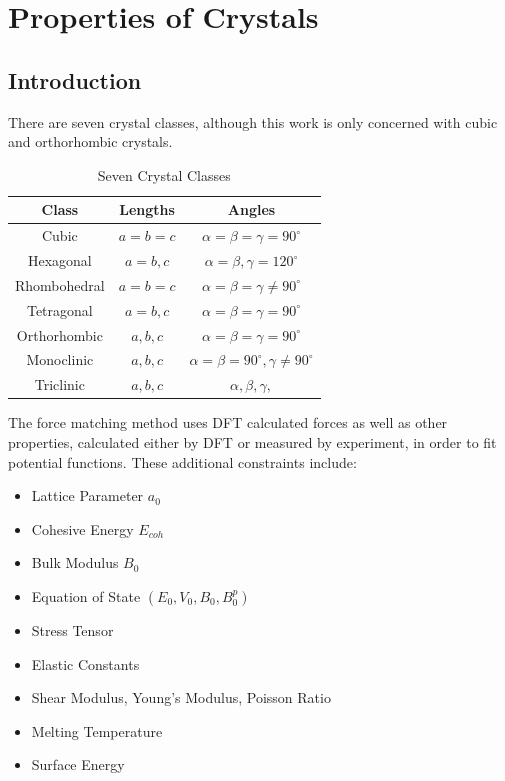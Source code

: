 \section{Properties of Crystals}

\subsection{Introduction}

There are seven crystal classes, although this work is only concerned with cubic and orthorhombic crystals.  

\begin{table}[h]
\caption{Seven Crystal Classes}
\begin{center}
\begin{tabular}{c c c}
Class & Lengths & Angles \\
\hline\hline
Cubic & $a = b = c$ & $ \alpha = \beta = \gamma = 90^{\circ}$ \\
Hexagonal & $a = b, c $ & $ \alpha = \beta, \gamma = 120^{\circ}$ \\
Rhombohedral & $a = b = c $ & $ \alpha = \beta = \gamma \neq 90^{\circ}$ \\
Tetragonal & $a = b, c $ & $ \alpha = \beta = \gamma = 90^{\circ}$ \\
Orthorhombic & $a, b, c $ & $ \alpha = \beta = \gamma = 90^{\circ}$ \\
Monoclinic & $a, b, c $ & $ \alpha = \beta = 90^{\circ}, \gamma \neq 90^{\circ} $ \\
Triclinic & $a, b, c $ & $ \alpha, \beta, \gamma, $ \\
\end{tabular}
\end{center}
\end{table}




The force matching method uses DFT calculated forces as well as other properties, calculated either by DFT or measured by experiment, in order to fit potential functions.  These additional constraints include:

\begin{itemize}
\item Lattice Parameter $a_0$
\item Cohesive Energy $E_{coh}$
\item Bulk Modulus $B_{0}$
\item Equation of State $(E_{0}, V_{0}, B_0, {B^{p}_0})$
\item Stress Tensor
\item Elastic Constants
\item Shear Modulus, Young's Modulus, Poisson Ratio
\item Melting Temperature
\item Surface Energy
\end{itemize}


